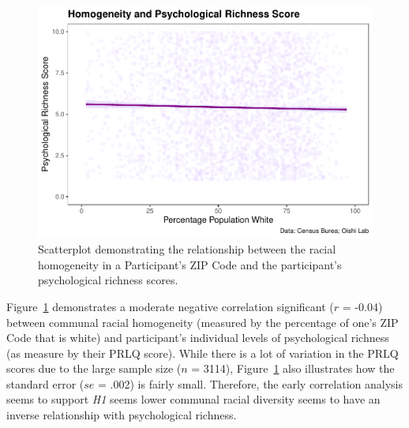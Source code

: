 \documentclass[
  man,floatsintext]{apa7}
\begin{document}
\begin{figure}[H]
\includegraphics[width=1\linewidth]{Richness-Diversity-Markdown_files/figure-latex/a-path-scatterplot-1} \caption{Scatterplot demonstrating the relationship between the racial homogeneity in a Participant's ZIP Code and the participant's psychological richness scores.}\label{fig:a-path-scatterplot}
\end{figure}





Figure~\ref{fig:a-path-scatterplot} demonstrates a moderate negative correlation significant (\(r\) = -0.04) between communal racial homogeneity (measured by the percentage of one's ZIP Code that is white) and participant's individual levels of psychological richness (as measure by their PRLQ score). While there is a lot of variation in the PRLQ scores due to the large sample size (\(n\) = 3114), Figure~\ref{fig:a-path-scatterplot} also illustrates how the standard error (\(se\) = .002) is fairly small. Therefore, the early correlation analysis seems to support \emph{H1} seems lower communal racial diversity seems to have an inverse relationship with psychological richness.
\end{document}

